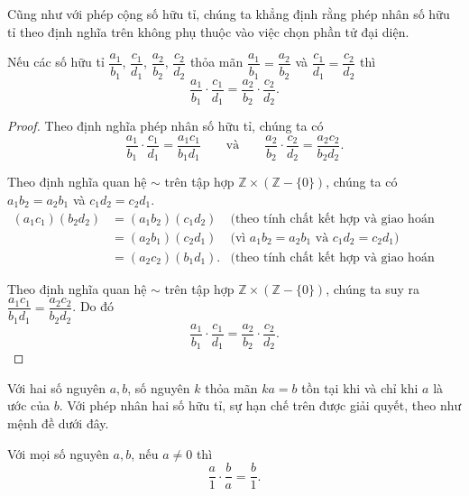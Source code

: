 Cũng như với phép cộng số hữu tỉ, chúng ta khẳng định rằng phép nhân số hữu tỉ theo định nghĩa trên không phụ thuộc vào việc chọn phần tử đại diện.
\begin{proposition}
    Nếu các số hữu tỉ $\dfrac{a_{1}}{b_{1}}$, $\dfrac{c_{1}}{d_{1}}$, $\dfrac{a_{2}}{b_{2}}$, $\dfrac{c_{2}}{d_{2}}$ thỏa mãn $\dfrac{a_{1}}{b_{1}} = \dfrac{a_{2}}{b_{2}}$ và $\dfrac{c_{1}}{d_{1}} = \dfrac{c_{2}}{d_{2}}$ thì
    \[
        \frac{a_{1}}{b_{1}}\cdot\frac{c_{1}}{d_{1}} = \frac{a_{2}}{b_{2}}\cdot\frac{c_{2}}{d_{2}}.
    \]
\end{proposition}

\begin{proof}
    Theo định nghĩa phép nhân số hữu tỉ, chúng ta có
    \[
        \frac{a_{1}}{b_{1}}\cdot\frac{c_{1}}{d_{1}} = \frac{a_{1}c_{1}}{b_{1}d_{1}}\qquad\text{và}\qquad\frac{a_{2}}{b_{2}}\cdot\frac{c_{2}}{d_{2}} = \frac{a_{2}c_{2}}{b_{2}d_{2}}.
    \]

    Theo định nghĩa quan hệ $\sim$ trên tập hợp $\mathbb{Z}\times(\mathbb{Z} - \{0\})$, chúng ta có $a_{1}b_{2} = a_{2}b_{1}$ và $c_{1}d_{2} = c_{2}d_{1}$.
    \begin{align*}
        (a_{1}c_{1})(b_{2}d_{2}) & = (a_{1}b_{2})(c_{1}d_{2})  & \text{(theo tính chất kết hợp và giao hoán của phép nhân số nguyên)} \\
                                 & = (a_{2}b_{1})(c_{2}d_{1})  & \text{(vì $a_{1}b_{2} = a_{2}b_{1}$ và $c_{1}d_{2} = c_{2}d_{1}$)}   \\
                                 & = (a_{2}c_{2})(b_{1}d_{1}). & \text{(theo tính chất kết hợp và giao hoán của phép nhân số nguyên)}
    \end{align*}

    Theo định nghĩa quan hệ $\sim$ trên tập hợp $\mathbb{Z}\times(\mathbb{Z} - \{0\})$, chúng ta suy ra $\dfrac{a_{1}c_{1}}{b_{1}d_{1}} = \dfrac{a_{2}c_{2}}{b_{2}d_{2}}$. Do đó
    \[
        \frac{a_{1}}{b_{1}}\cdot\frac{c_{1}}{d_{1}} = \frac{a_{2}}{b_{2}}\cdot\frac{c_{2}}{d_{2}}.
    \]
\end{proof}

Với hai số nguyên $a, b$, số nguyên $k$ thỏa mãn $ka = b$ tồn tại khi và chỉ khi $a$ là ước của $b$. Với phép nhân hai số hữu tỉ, sự hạn chế trên được giải quyết, theo như mệnh đề dưới đây.
\begin{proposition}
    Với mọi số nguyên $a, b$, nếu $a\ne 0$ thì
    \[
        \frac{a}{1}\cdot\frac{b}{a} = \frac{b}{1}.
    \]
\end{proposition}

